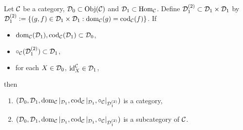 \documentclass{book}
\begin{document}
	\begin{ex}
		Let $\MC$ be a category, $\MD_0 \subset \Obj(\MC)$ and $\MD_1 \subset \Hom_{\MC}$. Define $\MD_1^{(2)} \subset \MD_1 \times \MD_1$ by $\MD_1^{(2)} \defeq \{(g,f) \in \MD_1 \times \MD_1: \dom_{\MC}(g) = \cod_{\MC}(f)\}$. If 
		\begin{itemize}
			\item $\dom_{\MC}(\MD_1), \cod_{\MC}(\MD_1) \subset \MD_0$,
			\item $\circ_{\MC}(\MD_1^{(2)}) \subset \MD_1$,
			\item for each $X \in \MD_0$, $\id_X^{\MC} \in \MD_1$,
		\end{itemize}
		then 
		\begin{enumerate}
			\item $(\MD_0, \MD_1, \dom_{\MC}|_{\MD_1}, \cod_{\MC}|_{\MD_1}, \circ_{\MC}|_{\MD_1^{(2)}})$ is a category,
			\item $(\MD_0, \MD_1, \dom_{\MC}|_{\MD_1}, \cod_{\MC}|_{\MD_1}, \circ_{\MC}|_{\MD_1^{(2)}})$ is a subcategory of $\MC$.
		\end{enumerate}
	\end{ex}
	
\end{document}
